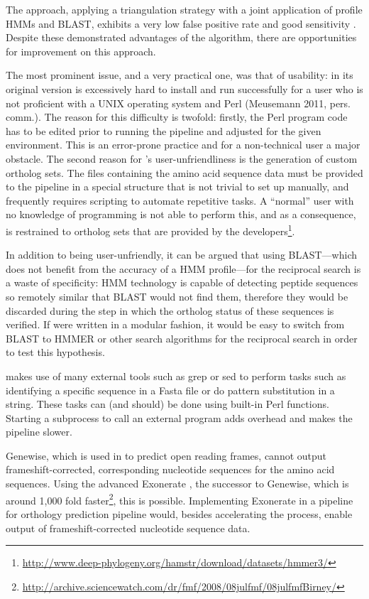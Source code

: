 The \hamstr approach, applying a triangulation strategy with a joint application
of profile HMMs and BLAST, exhibits a very low false positive rate and good
sensitivity \citep{ebersberger2009}. Despite these demonstrated advantages of
the \hamstr algorithm, there are opportunities for improvement on this approach.

The most prominent issue, and a very practical one, was that of usability:
\hamstr in its original version is excessively hard to install and run
successfully for a user who is not proficient with a UNIX operating system and
Perl (Meusemann 2011, pers. comm.). The reason for this difficulty is twofold:
firstly, the Perl program code has to be edited prior to running the pipeline
and adjusted for the given environment. This is an error-prone practice and for
a non-technical user a major obstacle. The second reason for \hamstr's
user-unfriendliness is the generation of custom ortholog sets. The files
containing the amino acid sequence data must be provided to the pipeline in a
special structure that is not trivial to set up manually, and frequently
requires scripting to automate repetitive tasks. A ``normal'' user with no
knowledge of programming is not able to perform this, and as a consequence, is
restrained to ortholog sets that are provided by the
developers\footnote{\url{http://www.deep-phylogeny.org/hamstr/download/datasets/hmmer3/}}.

In addition to \hamstr being user-unfriendly, it can be argued that using
BLAST---which does not benefit from the accuracy of a HMM profile---for the
reciprocal search is a waste of specificity: HMM technology is capable of
detecting peptide sequences so remotely similar that BLAST would not find them,
therefore they would be discarded during the step in which the ortholog status
of these sequences is verified. If \hamstr were written in a modular fashion, it
would be easy to switch from BLAST to HMMER or other search algorithms for the
reciprocal search in order to test this hypothesis. 

\hamstr makes use of many external tools such as grep or sed to
perform tasks such as identifying a specific sequence in a Fasta file or
do pattern substitution in a string. These tasks can (and should) be done using
built-in Perl functions. Starting a subprocess to call an external program adds
overhead and makes the pipeline slower.

Genewise, which is used in \hamstr to predict open reading frames, cannot output
frameshift-corrected, corresponding nucleotide sequences for the amino acid
sequences. Using the advanced Exonerate \citep{slater2005}, the successor to
Genewise, which is around 1,000 fold
faster\footnote{\url{http://archive.sciencewatch.com/dr/fmf/2008/08julfmf/08julfmfBirney/}},
this is possible. Implementing Exonerate in a pipeline for orthology prediction
pipeline would, besides accelerating the process, enable output of
frameshift-corrected nucleotide sequence data.

